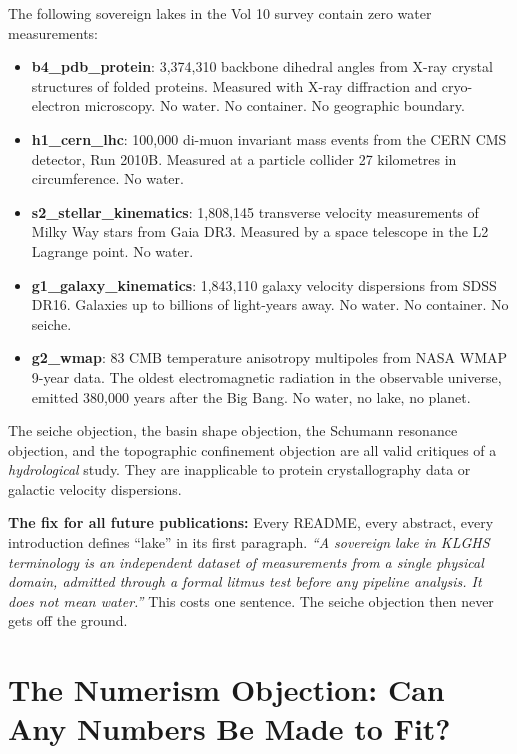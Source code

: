 \documentclass[11pt, letterpaper, openany]{book}
\begin{document}
The following sovereign lakes in the Vol 10 survey contain zero
water measurements:

\begin{itemize}
    \item \textbf{b4\_pdb\_protein}: 3,374,310 backbone dihedral angles
    from X-ray crystal structures of folded proteins. Measured with
    X-ray diffraction and cryo-electron microscopy. No water. No
    container. No geographic boundary.
    \item \textbf{h1\_cern\_lhc}: 100,000 di-muon invariant mass events
    from the CERN CMS detector, Run 2010B. Measured at a particle
    collider 27 kilometres in circumference. No water.
    \item \textbf{s2\_stellar\_kinematics}: 1,808,145 transverse
    velocity measurements of Milky Way stars from Gaia DR3. Measured
    by a space telescope in the L2 Lagrange point. No water.
    \item \textbf{g1\_galaxy\_kinematics}: 1,843,110 galaxy velocity
    dispersions from SDSS DR16. Galaxies up to billions of light-years
    away. No water. No container. No seiche.
    \item \textbf{g2\_wmap}: 83 CMB temperature anisotropy multipoles
    from NASA WMAP 9-year data. The oldest electromagnetic radiation
    in the observable universe, emitted 380,000 years after the Big Bang.
    No water, no lake, no planet.
\end{itemize}

The seiche objection, the basin shape objection, the Schumann resonance
objection, and the topographic confinement objection are all valid
critiques of a \textit{hydrological} study. They are inapplicable
to protein crystallography data or galactic velocity dispersions.

\textbf{The fix for all future publications:} Every README, every
abstract, every introduction defines ``lake'' in its first paragraph.
\textit{``A sovereign lake in KLGHS terminology is an independent
dataset of measurements from a single physical domain, admitted
through a formal litmus test before any pipeline analysis.
It does not mean water.''} This costs one sentence.
The seiche objection then never gets off the ground.

\clearpage
\chapter{The Numerism Objection: Can Any Numbers Be Made to Fit?}
\end{document}
